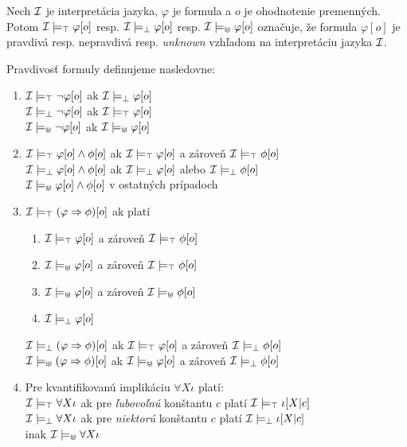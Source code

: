 \begin{definition}
    \label{interpretacia_1}
Nech $\mathcal{I}$ je interpretácia jazyka, $\varphi$ je formula a $o$ je ohodnotenie premenných. Potom
$\mathcal{I} \models_\top \varphi[o]$ resp. $\mathcal{I} \models_\bot \varphi[o]$ resp. $\mathcal{I}
\models_\Cup \varphi[o]$ označuje, že formula $\varphi[o]$ je pravdivá resp. nepravdivá resp.
\textit{unknown} vzhľadom na interpretáciu jazyka $\mathcal{I}$.
    
Pravdivosť formuly definujeme nasledovne:
    \begin{enumerate}[topsep=0pt,itemsep=-1ex,partopsep=1ex,parsep=1ex]
        \item
$\mathcal{I} \models_\top \lnot \varphi[o]$ ak $\mathcal{I} \models_\bot \varphi[o]$\\
$\mathcal{I} \models_\bot \lnot \varphi[o]$ ak $\mathcal{I} \models_\top \varphi[o]$\\
$\mathcal{I} \models_\Cup \lnot \varphi[o]$ ak $\mathcal{I} \models_\Cup \varphi[o]$
        \item
$\mathcal{I} \models_\top \varphi[o] \land \phi[o]$ ak $\mathcal{I} \models_\top \varphi[o]$ a zároveň
$\mathcal{I} \models_\top \phi[o]$\\
$\mathcal{I} \models_\bot \varphi[o] \land \phi[o]$ ak $\mathcal{I} \models_\bot \varphi[o]$ alebo $\mathcal{I}
\models_\bot \phi[o]$\\
$\mathcal{I} \models_\Cup \varphi[o] \land \phi[o]$ v ostatných prípadoch
        \item
$\mathcal{I} \models_\top (\varphi \Rightarrow \phi)[o]$ ak platí
        \begin{enumerate}[topsep=0pt,itemsep=-1ex,partopsep=1ex,parsep=1ex]
\item $\mathcal{I} \models_\top \varphi[o]$ a zároveň $\mathcal{I} \models_\top \phi[o]$
\item $\mathcal{I} \models_\Cup \varphi[o]$ a zároveň $\mathcal{I} \models_\top \phi[o]$
\item $\mathcal{I} \models_\Cup \varphi[o]$ a zároveň $\mathcal{I} \models_\Cup \phi[o]$
\item $\mathcal{I} \models_\bot \varphi[o]$
        \end{enumerate}
$\mathcal{I} \models_\bot (\varphi \Rightarrow \phi)[o]$ ak $\mathcal{I} \models_\top \varphi[o]$ a zároveň
$\mathcal{I} \models_\bot \phi[o]$\\
$\mathcal{I} \models_\Cup (\varphi \Rightarrow \phi)[o]$ ak $\mathcal{I} \models_\Cup \varphi[o]$ a
zároveň $\mathcal{I} \models_\bot \phi[o]$
\item Pre kvantifikovanú implikáciu $\forall X \iota$ platí:\\
$\mathcal{I} \models_\top \forall X \iota$ ak pre \textit{ľubovoľnú} konštantu $c$ platí $\mathcal{I}
\models_\top \iota[X|c]$\\
$\mathcal{I} \models_\bot \forall X \iota$ ak pre \textit{niektorú} konštantu $c$ platí $\mathcal{I}
\models_\bot \iota[X|c]$\\
inak $\mathcal{I} \models_\Cup \forall X \iota$
    \end{enumerate}
\end{definition}

